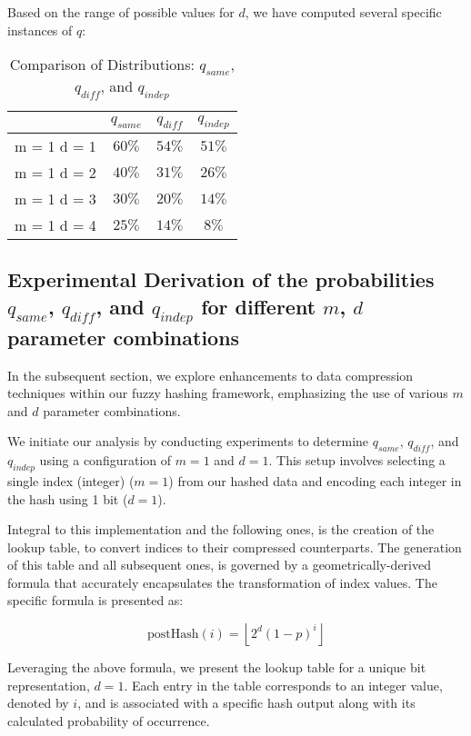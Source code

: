 Based on the range of possible values for \(d\), we have computed several specific instances of \(q\):
\begin{table}[H]
    \centering
    \renewcommand{\arraystretch}{1.25}\begin{tabular}{|c|c|c|c|}
        \hline
        & $q_{same}$ & $q_{diff}$ & $q_{indep}$\\
        \hline
        m = 1 d = 1 & $60\%$ & $54\%$ & $51\%$\\
        m = 1 d = 2 & $40\%$ & $31\%$ & $26\%$\\
        m = 1 d = 3 & $30\%$ & $20\%$ & $14\%$\\
        m = 1 d = 4 & $25\%$ & $14\%$ & $8\%$\\
        \hline
    \end{tabular}
\caption{Comparison of Distributions: $q_{same}$, $q_{diff}$, and $q_{indep}$}
\end{table}

\subsection{Experimental Derivation of the probabilities $q_{same}$, $q_{diff}$, and $q_{indep}$ for different \(m\), \(d\) parameter combinations}

In the subsequent section, we explore enhancements to data compression techniques within our fuzzy hashing framework, emphasizing the use of various \(m\) and \(d\) parameter combinations.

We initiate our analysis by conducting experiments to determine \(q_{same}\), \(q_{diff}\), and \(q_{indep}\) using a configuration of \(m=1\) and \(d=1\). This setup involves selecting a single index (integer) (\(m=1\)) from our hashed data and encoding each integer in the hash using 1 bit (\(d=1\)). 

Integral to this implementation and the following ones, is the creation of the lookup table, to convert indices to their compressed counterparts. The generation of this table and all subsequent ones, is governed by a geometrically-derived formula that accurately encapsulates the transformation of index values. The specific formula is presented as:

\[ 
\text{postHash}(i) = \left\lfloor 2^d \left(1 - p\right)^i \right\rfloor
\]

Leveraging the above formula, we present the lookup table for a unique bit representation, \(d=1\). Each entry in the table corresponds to an integer value, denoted by \(i\), and is associated with a specific hash output along with its calculated probability of occurrence.

